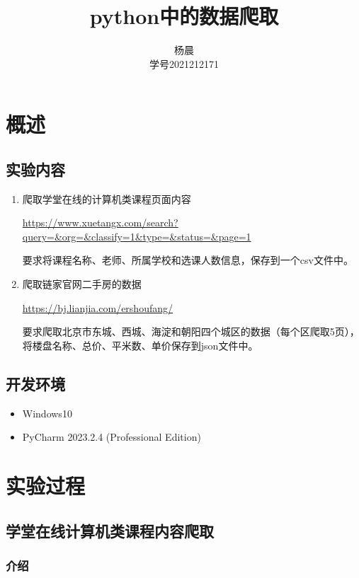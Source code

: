 \documentclass[lang=cn,11pt,a4paper]{elegantpaper}
\title{python中的数据爬取}
\author{杨晨 \\学号2021212171}
\institute{北京邮电大学 计算机学院}
\date{\zhtoday}
\begin{document}
\maketitle

\section{概述}

\subsection{实验内容}

\begin{enumerate}

    \item 爬取学堂在线的计算机类课程页面内容

    \url{https://www.xuetangx.com/search?query=&org=&classify=1&type=&status=&page=1}
    
    要求将课程名称、老师、所属学校和选课人数信息，保存到一个csv文件中。
    
    \item 爬取链家官网二手房的数据 
    
    \url{https://bj.lianjia.com/ershoufang/}
    
    要求爬取北京市东城、西城、海淀和朝阳四个城区的数据（每个区爬取5页），将楼盘名称、总价、平米数、单价保存到json文件中。
\end{enumerate}

\subsection{开发环境}

\begin{itemize}
    \item Windows10
    \item PyCharm 2023.2.4 (Professional Edition)
\end{itemize}

\section{实验过程}

\subsection{学堂在线计算机类课程内容爬取}

\subsubsection{介绍}
\end{document}

